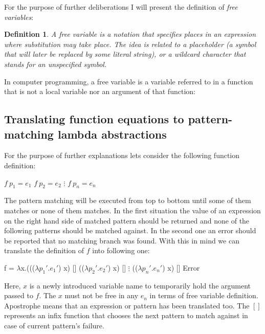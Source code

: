 \documentclass[12pt,a4paper]{report}
\newtheorem{definition}{Definition}[chapter]
\begin{document}
For the purpose of further deliberations I will present the definition of
\textit{free variables}:
\begin{definition}
  \label{def:free_variable}
  A free variable is a notation that specifies places in an expression where
  substitution may take place. The idea is related to a placeholder (a symbol
  that will later be replaced by some literal string), or a wildcard character
  that stands for an unspecified symbol.
\end{definition}

In computer programming, a free variable is a variable referred to in a
function that is not a local variable nor an argument of that function:

\subsection{Translating function equations to pattern-matching lambda
abstractions}
For the purpose of further explanations lets consider the following function
definition:

\vspace*{0.2in}
\begin{code}[style=haskell,mathescape=true]
$f\:p_{1} = e_{1}$
$f\:p_{2} = e_{2}$
   $\vdots$
$f\:p_{n} = e_{n}$
\end{code}

The pattern matching will be executed from top to bottom until some of them
matches or none of them matches. In the first situation the value of an
expression on the right hand side of matched pattern should be returned and
none of the following patterns should be matched against. In the second one an
error should be reported that no matching branch was found. With this in mind
we can translate the definition of $f$ into following one:

\vspace*{0.2in}
\begin{code}[style=haskell,mathescape=true]
f = $\lambda$x.((($\lambda p_{1}'$.$e_{1}'$) x) []
        (($\lambda p_{2}'$.$e_{2}'$) x) []
              $\vdots$
        (($\lambda p_{n}'$.$e_{n}'$) x) []
        Error
\end{code}

Here, $x$ is a newly introduced variable name to temporarily hold the argument
passed to $f$. The $x$ must not be free in any $e_{n}$ in terms of free
variable definition. Apostrophe means that an expression or pattern has been
translated too. The $[]$ represents an infix function that chooses the next
pattern to match against in case of current pattern's failure.
\end{document}
